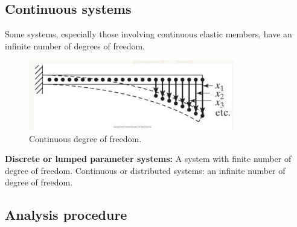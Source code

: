 \subsection{Continuous systems}
Some systems, especially those involving continuous elastic members, have an infinite number of degrees of freedom.
\begin{figure}[H]
    \centering
    \includegraphics[width = 0.8\textwidth]{./img/diagram6.jpg}
    \caption{Continuous degree of freedom.}
\end{figure}
\textbf{Discrete or lumped parameter systems:} A system with finite number of degree of freedom.
Continuous or distributed systems: an infinite number of degree of freedom.
\subsection{Analysis procedure}

